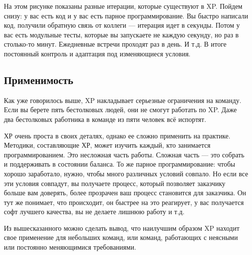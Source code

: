 \documentclass{../../text-style}
\begin{document}
На этом рисунке показаны разные итерации, которые существуют в XP. Пойдем снизу: у вас есть код и у вас есть парное программирование. Вы быстро написали код, получили обратную связь от коллеги --- итерация идет в секунды. Потом у вас есть модульные тесты, которые вы запускаете не каждую секунду, но раз в столько-то минут. Ежедневные встречи проходят раз в день. И т.д. В итоге постоянный контроль и адаптация под изменяющиеся условия.

\subsection{Применимость}

Как уже говорилось выше, XP накладывает серьезные ограничения на команду. Если вы берете пять бестолковых людей, они не смогут работать по XP. Даже два бестолковых работника в команде из пяти человек всё испортят.

ХР очень проста в своих деталях, однако ее сложно применить на практике. Методики, составляющие ХР, может изучить каждый, кто занимается программированием. Это несложная часть работы. Сложная часть --- это собрать и поддерживать в состоянии баланса. То же парное программирование: чтобы хорошо заработало, нужно, чтобы много различных условий совпало. Но если все эти условия совпадут, вы получаете процесс, который позволяет заказчику больше вам доверять, более прозрачен ваш процесс становится для заказчика. Он тут же понимает, что происходит, он быстрее на это реагирует, у вас получается софт лучшего качества, вы не делаете лишнюю работу и т.д.

Из вышесказанного можно сделать вывод, что наилучшим образом XP находит свое применение для небольших команд, или команд, работающих с неясными или постоянно меняющимися требованиями. 
\end{document}
